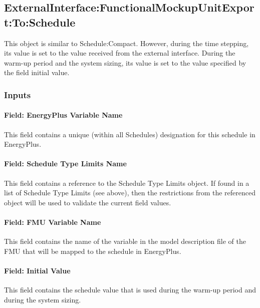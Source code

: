 \subsection{ExternalInterface:FunctionalMockupUnitExport:To:Schedule}\label{externalinterfacefunctionalmockupunitexporttoschedule}

This object is similar to Schedule:Compact. However, during the time stepping, its value is set to the value received from the external interface. During the warm-up period and the system sizing, its value is set to the value specified by the field initial value.

\subsubsection{Inputs}\label{inputs-10-005}

\paragraph{Field: EnergyPlus Variable Name}\label{field-energyplus-variable-name-5}

This field contains a unique (within all Schedules) designation for this schedule in EnergyPlus.

\paragraph{Field: Schedule Type Limits Name}\label{field-schedule-type-limits-name-2}

This field contains a reference to the Schedule Type Limits object. If found in a list of Schedule Type Limits (see above), then the restrictions from the referenced object will be used to validate the current field values.

\paragraph{Field: FMU Variable Name}\label{field-fmu-variable-name-5}

This field contains the name of the variable in the model description file of the FMU that will be mapped to the schedule in EnergyPlus.

\paragraph{Field: Initial Value}\label{field-initial-value-6}

This field contains the schedule value that is used during the warm-up period and during the system sizing.

